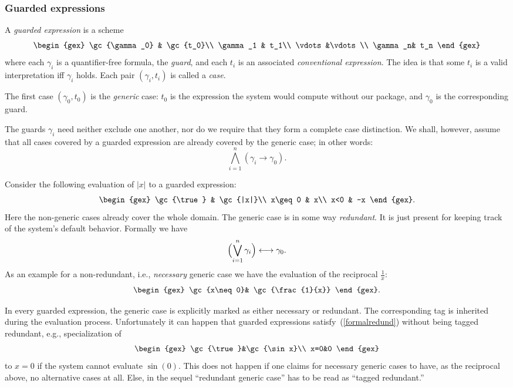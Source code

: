 \subsubsection{Guarded expressions}
A {\em guarded expression} is a scheme
$$
\begin{gex}
\gc{\gamma_0} & \gc{t_0}\\
\gamma_1 & t_1\\
\vdots&\vdots\\
\gamma_n& t_n
\end{gex}
$$
where each $\gamma_i$ is a quantifier-free formula, the {\em guard},
and each $t_i$ is an associated {\em conventional expression}. The
idea is that some $t_i$ is a valid interpretation iff $\gamma_i$
holds. Each pair $(\gamma_i,t_i)$ is called a {\em case}.

The first case $(\gamma_0,t_0)$ is the {\em generic} case: $t_0$ is
the expression the system would compute without our package, and
$\gamma_0$ is the corresponding guard.

The guards $\gamma_i$ need neither exclude one another, nor do we
require that they form a complete case distinction. We shall, however,
assume that all cases covered by a guarded expression are already
covered by the generic case; in other words:
\begin{equation}
\bigwedge_{i=1}^n(\gamma_i\longrightarrow\gamma_0).\label{gencoversall}
\end{equation}

Consider the following evaluation of $|x|$ to a guarded expression:
$$
\begin{gex}
\gc{\true} & \gc{|x|}\\
x\geq0 & x\\
x<0 & -x
\end{gex}.
$$
Here the non-generic cases already cover the whole domain. The
generic case is in some way {\em redundant}. It is just present for
keeping track of the system's default behavior. Formally we have
\begin{equation}
\Bigl(\bigvee_{i=1}^n\gamma_i\Bigr)\longleftrightarrow\gamma_0.
\label{formalredund}
\end{equation}
As an example for a non-redundant, i.e., {\em necessary} generic case
we have the evaluation of the reciprocal $\frac{1}{x}$:
$$
\begin{gex}
\gc{x\neq0}& \gc{\frac{1}{x}}
\end{gex}.
$$

In every guarded expression, the generic case is explicitly marked as
either necessary or redundant. The corresponding tag is inherited
during the evaluation process. Unfortunately it can happen that
guarded expressions satisfy~(\ref{formalredund}) without being tagged
redundant, e.g., specialization of
$$
\begin{gex}
\gc{\true}&\gc{\sin x}\\
x=0&0
\end{gex}
$$
to $x=0$ if the system cannot evaluate $\sin(0)$. This does not happen
if one claims for necessary generic cases to have, as the reciprocal
above, no alternative cases at all. Else, in the sequel ``redundant
generic case'' has to be read as ``tagged redundant.''


